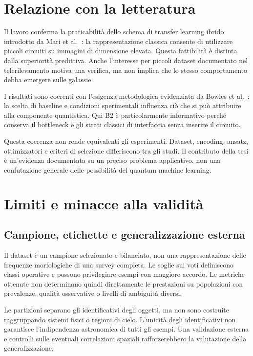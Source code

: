\section{Relazione con la letteratura}

Il lavoro conferma la praticabilità dello schema di transfer learning
ibrido introdotto da Mari et al.~\cite{mari2020transfer}: la
rappresentazione classica consente di utilizzare piccoli circuiti
su immagini di dimensione elevata. Questa fattibilità è distinta
dalla superiorità predittiva. Anche l'interesse per piccoli dataset
documentato nel telerilevamento \cite{otgonbaatar2023transfer} motiva
una verifica, ma non implica che lo stesso comportamento debba
emergere sulle galassie.

I risultati sono coerenti con l'esigenza metodologica evidenziata
da Bowles et al.~\cite{bowles2024benchmarking}: la scelta di
baseline e condizioni sperimentali influenza ciò che si può
attribuire alla componente quantistica. Qui B2 è particolarmente
informativo perché conserva il bottleneck e gli strati classici
di interfaccia senza inserire il circuito.

Questa coerenza non rende equivalenti gli esperimenti. Dataset,
encoding, ansatz, ottimizzatori e criteri di selezione differiscono
tra gli studi. Il contributo della tesi è un'evidenza documentata
su un preciso problema applicativo, non una confutazione generale
delle possibilità del quantum machine learning.

\section{Limiti e minacce alla validità}
\label{sec:disc-limiti}

\subsection{Campione, etichette e generalizzazione esterna}

Il dataset è un campione selezionato e bilanciato, non una rappresentazione
delle frequenze morfologiche di una survey completa. Le soglie sui voti
definiscono classi operative e possono privilegiare esempi con maggiore
accordo. Le metriche ottenute non determinano quindi direttamente
le prestazioni su popolazioni con prevalenze, qualità osservative o
livelli di ambiguità diversi.

Le partizioni separano gli identificativi degli oggetti, ma non sono
costruite raggruppando sistemi fisici o regioni di cielo. L'unicità
degli identificativi non garantisce l'indipendenza astronomica di
tutti gli esempi. Una validazione esterna e controlli sulle eventuali
correlazioni spaziali rafforzerebbero la valutazione della generalizzazione.

